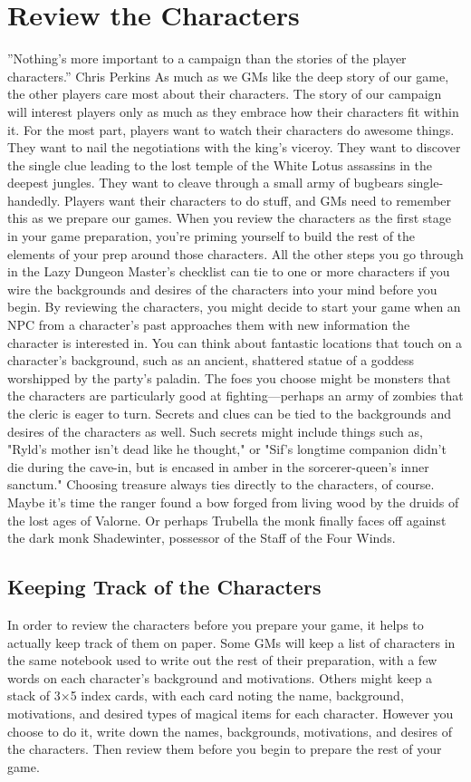 \documentclass[10pt,a4paper,twoside,bg=print,twocolumn,openany,nodeprecatedcode]{dndbook}
\begin{document}
\section{Review the Characters}
\DndQuote%
{}
{''Nothing's more important to a campaign than the stories of the player characters.''}
{Chris Perkins}
As much as we GMs like the deep story of our game, the other players care most about their characters. The story of our campaign will interest players only as much as they embrace how their characters fit within it. For the most part, players want to watch their characters do awesome things. They want to nail the negotiations with the king's viceroy. They want to discover the single clue leading to the lost temple of the White Lotus assassins in the deepest jungles. They want to cleave through a small army of bugbears single-handedly. Players want their characters to do stuff, and GMs need to remember this as we prepare our games.
When you review the characters as the first stage in your game preparation, you're priming yourself to build the rest of the elements of your prep around those characters. All the other steps you go through in the Lazy Dungeon Master's checklist can tie to one or more characters if you wire the backgrounds and desires of the characters into your mind before you begin.
By reviewing the characters, you might decide to start your game when an NPC from a character's past approaches them with new information the character is interested in. You can think about fantastic locations that touch on a character's background, such as an ancient, shattered statue of a goddess worshipped by the party's paladin. The foes you choose might be monsters that the characters are particularly good at fighting—perhaps an army of zombies that the cleric is eager to turn.
Secrets and clues can be tied to the backgrounds and desires of the characters as well. Such secrets might include things such as, "Ryld's mother isn't dead like he thought," or "Sif's longtime companion didn't die during the cave-in, but is encased in amber in the sorcerer-queen's inner sanctum."
Choosing treasure always ties directly to the characters, of course. Maybe it's time the ranger found a bow forged from living wood by the druids of the lost ages of Valorne. Or perhaps Trubella the monk finally faces off against the dark monk Shadewinter, possessor of the Staff of the Four Winds.
\subsection{Keeping Track of the Characters}
In order to review the characters before you prepare your game, it helps to actually keep track of them on paper. Some GMs will keep a list of characters in the same notebook used to write out the rest of their preparation, with a few words on each character's background and motivations. Others might keep a stack of 3×5 index cards, with each card noting the name, background, motivations, and desired types of magical items for each character.
However you choose to do it, write down the names, backgrounds, motivations, and desires of the characters. Then review them before you begin to prepare the rest of your game.
\end{document}
